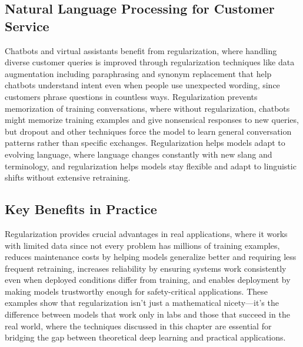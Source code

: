 \subsection{Natural Language Processing for Customer Service}

Chatbots and virtual assistants benefit from regularization, where handling diverse customer queries is improved through regularization techniques like data augmentation including paraphrasing and synonym replacement that help chatbots understand intent even when people use unexpected wording, since customers phrase questions in countless ways. Regularization prevents memorization of training conversations, where without regularization, chatbots might memorize training examples and give nonsensical responses to new queries, but dropout and other techniques force the model to learn general conversation patterns rather than specific exchanges. Regularization helps models adapt to evolving language, where language changes constantly with new slang and terminology, and regularization helps models stay flexible and adapt to linguistic shifts without extensive retraining.

\subsection{Key Benefits in Practice}

Regularization provides crucial advantages in real applications, where it works with limited data since not every problem has millions of training examples, reduces maintenance costs by helping models generalize better and requiring less frequent retraining, increases reliability by ensuring systems work consistently even when deployed conditions differ from training, and enables deployment by making models trustworthy enough for safety-critical applications. These examples show that regularization isn't just a mathematical nicety—it's the difference between models that work only in labs and those that succeed in the real world, where the techniques discussed in this chapter are essential for bridging the gap between theoretical deep learning and practical applications.

